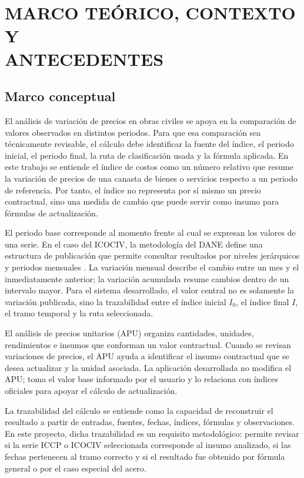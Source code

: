 \documentclass[12pt,letterpaper]{article}
\providecommand{\parencite}{\citep}
\newcommand{\ICOCIV}{ICOCIV}
\newcommand{\ICCP}{ICCP}
\newcommand{\DANE}{DANE}
\begin{document}
\section[MARCO TEÓRICO, CONTEXTO Y ANTECEDENTES]{MARCO TEÓRICO, CONTEXTO Y\\ ANTECEDENTES}

\subsection{Marco conceptual}

El análisis de variación de precios en obras civiles se apoya en la comparación de valores observados en distintos periodos. Para que esa comparación sea técnicamente revisable, el cálculo debe identificar la fuente del índice, el periodo inicial, el periodo final, la ruta de clasificación usada y la fórmula aplicada. En este trabajo se entiende el índice de costos como un número relativo que resume la variación de precios de una canasta de bienes o servicios respecto a un periodo de referencia. Por tanto, el índice no representa por sí mismo un precio contractual, sino una medida de cambio que puede servir como insumo para fórmulas de actualización.

El periodo base corresponde al momento frente al cual se expresan los valores de una serie. En el caso del \ICOCIV, la metodología del \DANE{} define una estructura de publicación que permite consultar resultados por niveles jerárquicos y periodos mensuales \parencite{dane_ficha_icociv,dane_metodologia_icociv}. La variación mensual describe el cambio entre un mes y el inmediatamente anterior; la variación acumulada resume cambios dentro de un intervalo mayor. Para el sistema desarrollado, el valor central no es solamente la variación publicada, sino la trazabilidad entre el índice inicial \(I_0\), el índice final \(I\), el tramo temporal y la ruta seleccionada.

El análisis de precios unitarios (APU) organiza cantidades, unidades, rendimientos e insumos que conforman un valor contractual. Cuando se revisan variaciones de precios, el APU ayuda a identificar el insumo contractual que se desea actualizar y la unidad asociada. La aplicación desarrollada no modifica el APU; toma el valor base informado por el usuario y lo relaciona con índices oficiales para apoyar el cálculo de actualización.

La trazabilidad del cálculo se entiende como la capacidad de reconstruir el resultado a partir de entradas, fuentes, fechas, índices, fórmulas y observaciones. En este proyecto, dicha trazabilidad es un requisito metodológico: permite revisar si la serie \ICCP{} o \ICOCIV{} seleccionada corresponde al insumo analizado, si las fechas pertenecen al tramo correcto y si el resultado fue obtenido por fórmula general o por el caso especial del acero.
\end{document}
